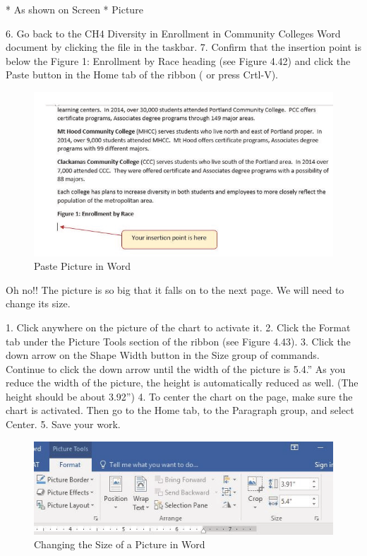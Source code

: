 * As shown on Screen
* Picture

6. Go back to the CH4 Diversity in Enrollment in Community Colleges Word document by clicking the
file in the taskbar.
7. Confirm that the insertion point is below the Figure 1: Enrollment by Race heading (see Figure
4.42) and click the Paste button in the Home tab of the ribbon ( or press Crtl-V).


\begin{figure}[H]
	\centering
	\includegraphics[width=\maxwidth{.95\linewidth}]{gfx/ch04_fig45}
	\caption{Paste Picture in Word}
	\label{04:fig45}
\end{figure}


Oh no!! The picture is so big that it falls on to the next page. We will need to change its size.

1. Click anywhere on the picture of the chart to activate it.
2. Click the Format tab under the Picture Tools section of the ribbon (see Figure 4.43).
3. Click the down arrow on the Shape Width button in the Size group of commands. Continue to
click the down arrow until the width of the picture is 5.4.” As you reduce the width of the
picture, the height is automatically reduced as well. (The height should be about 3.92'')
4. To center the chart on the page, make sure the chart is activated. Then go to the Home tab, to
the Paragraph group, and select Center.
5. Save your work.


\begin{figure}[H]
	\centering
	\includegraphics[width=\maxwidth{.95\linewidth}]{gfx/ch04_fig46}
	\caption{Changing the Size of a Picture in Word}
	\label{04:fig46}
\end{figure}


